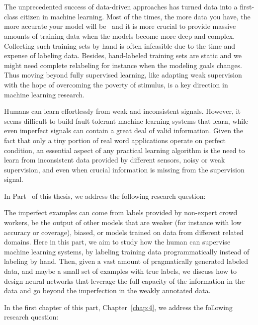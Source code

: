 \part{} %
\label{part2}
The unprecedented success of data-driven approaches has turned data into a first-class citizen in machine learning. Most of the times, the more data you have, the more accurate your model will be~\citep{halevy2009unreasonable,sun2017revisiting} and it is more crucial to provide massive amounts of training data when the models become more deep and complex.
Collecting such training sets by hand is often infeasible due to the time and expense of labeling data. Besides, hand-labeled training sets are static and we might need complete relabeling for instance when the modeling goals changes. Thus moving beyond fully supervised learning, like adapting weak supervision with the hope of overcoming the poverty of stimulus, is a key direction in machine learning research.

Humans can learn effortlessly from weak and inconsistent signals. However, it seems difficult to build fault-tolerant machine learning systems that learn, while even imperfect signals can contain a great deal of valid information.
Given the fact that only a tiny portion of real word applications operate on perfect condition, an essential aspect of any practical learning algorithm is the need to learn from inconsistent data provided by different sensors, noisy or weak supervision, and even when crucial information is missing from the supervision signal.

In Part~\ref{part2} of this thesis, we address the following research question:

The imperfect examples can come from labels provided by non-expert crowd workers, be the output of other models that are weaker (for instance with low accuracy or coverage), biased, or models trained on data from different related domains. 
Here in this part, we aim to study how the human can supervise machine learning systems, by labeling training data programmatically instead of labeling by hand. Then, given a vast amount of pragmatically generated labeled data, and maybe a small set of examples with true labels,  we discuss how to design neural networks that leverage the full capacity of the information in the data and go beyond the imperfection in the weakly annotated data.


In the first chapter of this part, Chapter~\ref{chap:4}, we address the following research question:

